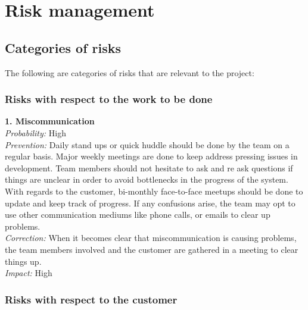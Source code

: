 \documentclass[12pt,letterpaper, margin=1in]{article}
\begin{document}
\section{Risk management}

\subsection{Categories of risks}
The following are categories of risks that are relevant to the project: 

\subsubsection{Risks with respect to the work to be done}
\textbf{1. Miscommunication} \\
\textit{Probability:} High \\
\textit{Prevention:} Daily stand ups or quick huddle should be done by the team on a regular basis. Major weekly meetings are done to keep address pressing issues in development. Team members should not hesitate to ask and re ask questions if things are unclear in order to avoid bottlenecks in the progress of the system. With regards to the customer, bi-monthly face-to-face meetups should be done to update and keep track of progress. If any confusions arise, the team may opt to use other communication mediums like phone calls, or emails to clear up problems. \\
\textit{Correction:} When it becomes clear that miscommunication is causing problems, the team members involved and the customer are gathered in a meeting to clear things up. \\
\textit{Impact:} High \\

\subsubsection{Risks with respect to the customer}
\end{document}

